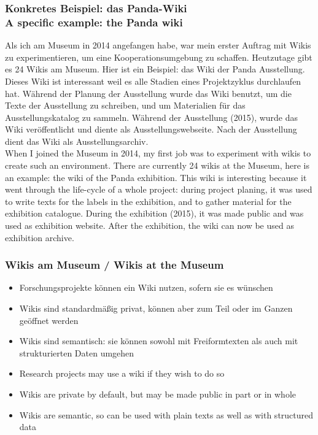 {\scriptsize
\begin{frame}
  \frametitle{Konkretes Beispiel: das Panda-Wiki\\\textcolor{mfn_green}{A specific example: the Panda wiki}}
  Als ich am Museum in 2014 angefangen habe, war mein erster Auftrag mit Wikis zu experimentieren, um eine Kooperationsumgebung zu schaffen. Heutzutage gibt es 24 Wikis am Museum. Hier ist ein Beispiel: das Wiki der Panda Ausstellung. Dieses Wiki ist interessant weil es alle Stadien eines Projektzyklus durchlaufen hat. Während der Planung der Ausstellung wurde das Wiki benutzt, um die Texte der Ausstellung zu schreiben, und um Materialien für das Ausstellungskatalog zu sammeln. Während der Ausstellung (2015), wurde das Wiki veröffentlicht und diente als Ausstellungswebseite. Nach der Ausstellung dient das Wiki als Ausstellungsarchiv. \\
  \bigskip
  \textcolor{mfn_green}{When I joined the Museum in 2014, my first job was to experiment with wikis to create such an environment. There are currently 24 wikis at the Museum, here is an example: the wiki of the Panda exhibition. This wiki is interesting because it went through the life-cycle of a whole project: during project planing, it was used to write texts for the labels in the exhibition, and to gather material for the exhibition catalogue. During the exhibition (2015), it was made public and was used as exhibition website. After the exhibition, the wiki can now be used as exhibition archive.}
\end{frame}
}
\begin{frame}
  \frametitle{Wikis am Museum / \textcolor{mfn_green}{Wikis at the Museum}}

  \begin{itemize}
  \item{Forschungsprojekte können ein Wiki nutzen, sofern sie es wünschen}
  \item{Wikis sind standardmäßig privat, können aber zum Teil oder im Ganzen geöffnet werden}
  \item{Wikis sind semantisch: sie können sowohl mit Freiformtexten als auch mit strukturierten Daten umgehen}
  \end{itemize}
  
  \begin{itemize}
  \item{\textcolor{mfn_green}{Research projects may use a wiki if they wish to do so}}
  \item{\textcolor{mfn_green}{Wikis are private by default, but may be made public in part or in whole}}
  \item{\textcolor{mfn_green}{Wikis are semantic, so can be used with plain texts as well as with structured data}}
  \end{itemize}
\end{frame}

